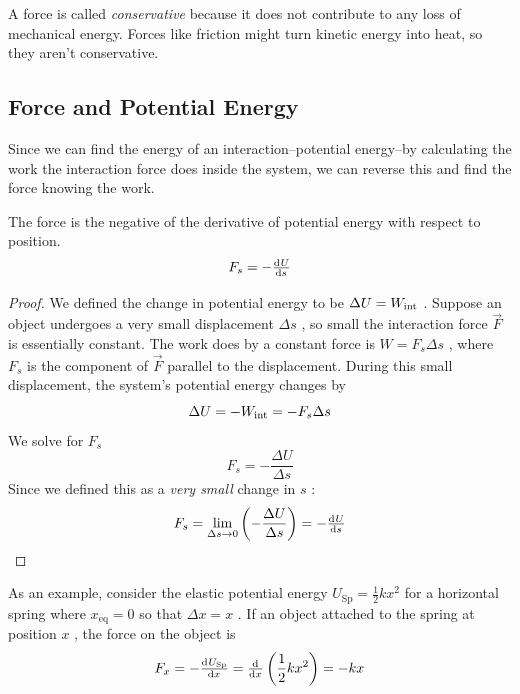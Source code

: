 A force is called \emph{conservative} because it does not contribute to
any loss of mechanical energy.  Forces like friction might turn kinetic
energy into heat, so they aren't conservative.

\subsection{Force and Potential Energy}

Since we can find the energy of an interaction--potential energy--by
calculating the work the interaction force does inside the system, we
can reverse this and find the force knowing the work.

The force is the negative of the derivative of potential energy with
respect to position.
\begin{equation}
    F_s = -\od{U}{s}
\end{equation}
\begin{proof}
    We defined the change in potential energy to be
    $
        \Delta U = W_{\mathrm{int}}
    $%
.    Suppose an object undergoes a very small displacement
    $
        \Delta s
    $%
    , so small the interaction force
    $
        \vec{F}
    $ is essentially constant.  The work does by a constant force is
    $
        W=F_s \Delta s
    $%
    , where
    $
        F_s
    $ is the component of
    $
        \vec{F}
    $ parallel to the displacement.  During this small displacement, the
    system's potential energy changes by
    \begin{equation}
        \Delta U = -W_{\mathrm{int}} = -F_s \Delta s
    \end{equation}
    We solve for
    $
        F_s
    $
    \begin{equation}
        F_s = -\frac{\Delta U}{\Delta s}
    \end{equation}
    Since we defined this as a \emph{very small} change in
    $
        s
    $%
    :
    \begin{equation}
        F_s = \lim_{\Delta s\to0} \left(-\frac{\Delta U}{\Delta s}\right)
        = -\od {U}{s}
    \end{equation}
\end{proof}
As an example, consider the elastic potential energy
$
    U_\mathrm{Sp} = \frac{1}{2}kx^2
$ for a horizontal spring where
$
    x_\mathrm{eq} = 0
$ so that
$
    \Delta x = x
$%
.  If an object attached to the spring at position
$
    x
$%
, the force on the object is
\begin{equation}
    F_x = -\od{U_\mathrm{Sp}}{x} = \od{}{x}\left(\frac{1}{2}kx^2\right)
    = -kx
\end{equation}

